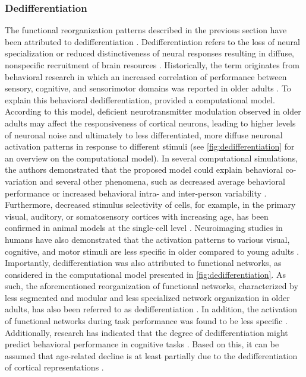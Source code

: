 \subsubsection{Dedifferentiation}
\label{theory:aging:dedif}
The functional reorganization patterns described in the previous section have been attributed to dedifferentiation \cite{Grady2012}. Dedifferentiation refers to the loss of neural specialization or reduced distinctiveness of neural responses resulting in diffuse, nonspecific recruitment of brain resources \cite{Koen2019}. Historically, the term originates from behavioral research in which an increased correlation of performance between sensory, cognitive, and sensorimotor domains was reported in older adults \cite{Baltes1997,Li2002}. To explain this behavioral dedifferentiation, \citeauthor{Li2000} \cite{Li2000, Li2001} provided a computational model. According to this model, deficient neurotransmitter modulation observed in older adults may affect the responsiveness of cortical neurons, leading to higher levels of neuronal noise and ultimately to less differentiated, more diffuse neuronal activation patterns in response to different stimuli \cite{Li2000,Li2001} (see \autoref{fig:dedifferentiation} for an overview on the computational model). In several computational simulations, the authors demonstrated that the proposed model could explain behavioral co-variation and several other phenomena, such as decreased average behavioral performance or increased behavioral intra- and inter-person variability \cite{Li2000,Li2002}. Furthermore, decreased stimulus selectivity of cells, for example, in the primary visual, auditory, or somatosensory cortices with increasing age, has been confirmed in animal models at the single-cell level \cite{Koen2019, Schmolesky2000, Costa2016, Spengler1995}. Neuroimaging studies in humans have also demonstrated that the activation patterns to various visual, cognitive, and motor stimuli are less specific in older compared to young adults \cite{Tucker2019, Koen2019,Carb2011}. Importantly, dedifferentiation was also attributed to functional networks, as considered in the computational model presented in \autoref{fig:dedifferentiation}. As such, the aforementioned reorganization of functional networks, characterized by less segmented and modular and less specialized network organization in older adults, has also been referred to as dedifferentiation \cite{Deery2023, Koen2019, Sala-Llonch2015}. In addition, the activation of functional networks during task performance was found to be less specific \cite{Rieck2021,Geerligs2014,Antonenko2013}. Additionally, research has indicated that the degree of dedifferentiation might predict behavioral performance in cognitive tasks \cite{Koen2019}. Based on this, it can be assumed that age-related decline is at least partially due to the dedifferentiation of cortical representations \cite{Koen2019}.

